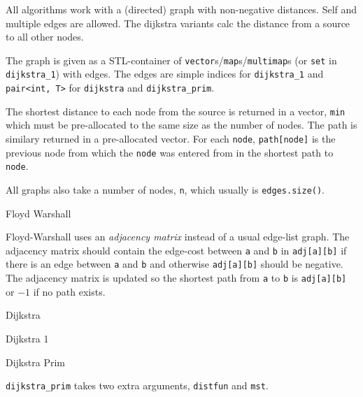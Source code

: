 
All algorithms work with a (directed) graph with non-negative distances.
Self and multiple edges are allowed. The dijkstra variants calc the
distance from a source to all other nodes.

The graph is given as a STL-container of
{\tt vector}s/{\tt map}s/{\tt multimap}s
(or {\tt set} in {\tt dijkstra\_1}) with edges.
The edges are simple indices for {\tt dijkstra\_1} and {\tt pair<int, T>} for
{\tt dijkstra} and {\tt dijkstra\_prim}.

The shortest distance to each node from the source is returned in a vector,
{\tt min} which must be pre-allocated to the same size as the number of nodes.
The path is similary returned in a pre-allocated vector. For each {\tt node},
{\tt path[node]} is the previous node from which the {\tt node} was entered
from in the shortest path to {\tt node}.

All graphs also take a number of nodes, {\tt n}, which usually is
{\tt edges.size()}.

\begin{algorithm}{Floyd Warshall}

Floyd-Warshall uses an \emph{adjacency matrix} instead of a usual edge-list
graph. The adjacency matrix should contain the edge-cost between
{\tt a} and {\tt b} in {\tt adj[a][b]} if there is an edge between
{\tt a} and {\tt b} and otherwise {\tt adj[a][b]} should be negative.
The adjacency matrix is updated so the shortest path from {\tt a} to
{\tt b} is {\tt adj[a][b]} or $-1$ if no path exists.
\end{algorithm}

\begin{algorithm}{Dijkstra}
\end{algorithm}

\begin{algorithm}{Dijkstra 1}
\end{algorithm}

\begin{algorithm}{Dijkstra Prim}

{\tt dijkstra\_prim} takes two extra arguments, {\tt distfun} and {\tt mst}.
\end{algorithm}
